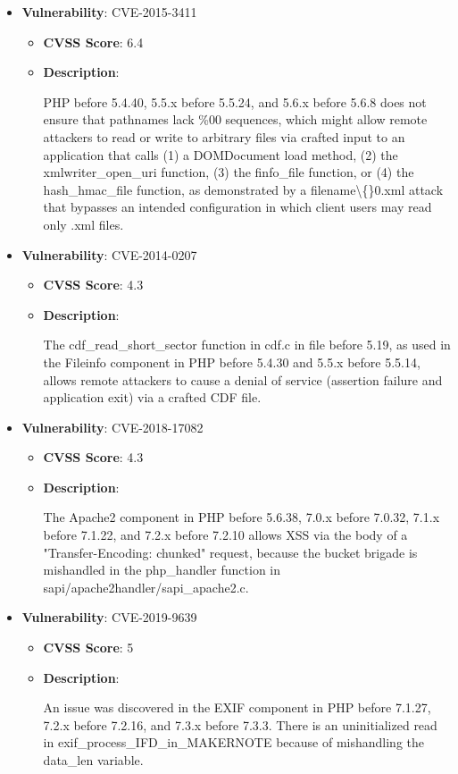 \documentclass{article}
\begin{document}
\begin{itemize}
        \item \textbf{Vulnerability}: CVE-2015-3411
        \begin{itemize}
            \item \textbf{CVSS Score}:  6.4 
            \item \textbf{Description}:
            \parbox[t]{0.9\linewidth}{
                \ttfamily PHP before 5.4.40, 5.5.x before 5.5.24, and 5.6.x before 5.6.8 does not ensure that pathnames lack \%00 sequences, which might allow remote attackers to read or write to arbitrary files via crafted input to an application that calls (1) a DOMDocument load method, (2) the xmlwriter\_open\_uri function, (3) the finfo\_file function, or (4) the hash\_hmac\_file function, as demonstrated by a filename\textbackslash\{\}0.xml attack that bypasses an intended configuration in which client users may read only .xml files.
            }
        \end{itemize}
    
        \item \textbf{Vulnerability}: CVE-2014-0207
        \begin{itemize}
            \item \textbf{CVSS Score}:  4.3 
            \item \textbf{Description}:
            \parbox[t]{0.9\linewidth}{
                \ttfamily The cdf\_read\_short\_sector function in cdf.c in file before 5.19, as used in the Fileinfo component in PHP before 5.4.30 and 5.5.x before 5.5.14, allows remote attackers to cause a denial of service (assertion failure and application exit) via a crafted CDF file.
            }
        \end{itemize}
    
        \item \textbf{Vulnerability}: CVE-2018-17082
        \begin{itemize}
            \item \textbf{CVSS Score}:  4.3 
            \item \textbf{Description}:
            \parbox[t]{0.9\linewidth}{
                \ttfamily The Apache2 component in PHP before 5.6.38, 7.0.x before 7.0.32, 7.1.x before 7.1.22, and 7.2.x before 7.2.10 allows XSS via the body of a "Transfer-Encoding: chunked" request, because the bucket brigade is mishandled in the php\_handler function in sapi/apache2handler/sapi\_apache2.c.
            }
        \end{itemize}
    
        \item \textbf{Vulnerability}: CVE-2019-9639
        \begin{itemize}
            \item \textbf{CVSS Score}:  5 
            \item \textbf{Description}:
            \parbox[t]{0.9\linewidth}{
                \ttfamily An issue was discovered in the EXIF component in PHP before 7.1.27, 7.2.x before 7.2.16, and 7.3.x before 7.3.3. There is an uninitialized read in exif\_process\_IFD\_in\_MAKERNOTE because of mishandling the data\_len variable.
            }
        \end{itemize}
    

\end{itemize}
\end{document}
